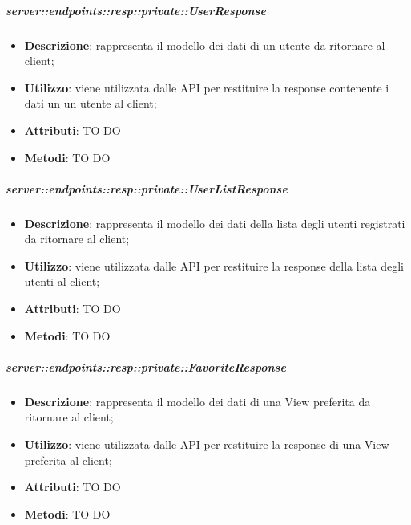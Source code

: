     \subparagraph{server::endpoints::resp::private::UserResponse} %
    \label{subp:bdsm_app_server_endpoints_resp_private_userresponse}
    \begin{itemize}
      \item \textbf{Descrizione}: rappresenta il modello dei dati di un utente da ritornare al client;
      \item \textbf{Utilizzo}: viene utilizzata dalle API per restituire la response contenente i dati un un utente al client;
	  \item \textbf{Attributi}: TO DO
	  \item \textbf{Metodi}: TO DO
    \end{itemize}
    
    \subparagraph{server::endpoints::resp::private::UserListResponse} %
    \label{subp:bdsm_app_server_endpoints_resp_private_userlistresponse}
    \begin{itemize}
      \item \textbf{Descrizione}: rappresenta il modello dei dati della lista degli utenti registrati da ritornare al client;
      \item \textbf{Utilizzo}: viene utilizzata dalle API per restituire la response della lista degli utenti al client;
	  \item \textbf{Attributi}: TO DO
	  \item \textbf{Metodi}: TO DO
    \end{itemize}

    \subparagraph{server::endpoints::resp::private::FavoriteResponse} %
    \label{subp:bdsm_app_server_endpoints_resp_private_favoriteresponse}
    \begin{itemize}
      \item \textbf{Descrizione}: rappresenta il modello dei dati di una View preferita da ritornare al client;
      \item \textbf{Utilizzo}: viene utilizzata dalle API per restituire la response di una View preferita al client;
	  \item \textbf{Attributi}: TO DO
	  \item \textbf{Metodi}: TO DO
    \end{itemize}

